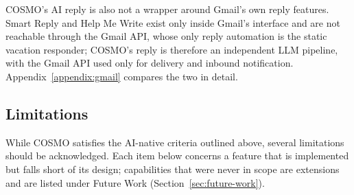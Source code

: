 \documentclass[a4paper]{article}
\begin{document}
COSMO's AI reply is also not a wrapper around Gmail's own reply features.
Smart Reply and Help Me Write exist only inside Gmail's interface and are
not reachable through the Gmail API, whose only reply automation is the
static vacation responder; COSMO's reply is therefore an independent LLM
pipeline, with the Gmail API used only for delivery and inbound
notification. Appendix~\ref{appendix:gmail} compares the two in detail.


\subsection{Limitations}
\label{sec:conclusion-limitations}

While COSMO satisfies the AI-native criteria outlined above,
several limitations should be acknowledged. Each item below concerns a
feature that is implemented but falls short of its design; capabilities that
were never in scope are extensions and are listed under Future Work
(Section~\ref{sec:future-work}).
\label{limit}
\end{document}
